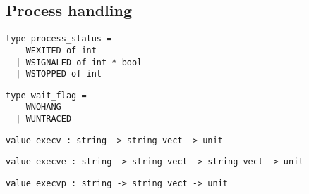 \subsection*{Process handling }\begin{verbatim}
type process_status =
    WEXITED of int
  | WSIGNALED of int * bool
  | WSTOPPED of int
\end{verbatim}
\begin{comment}
 The termination status of a process. \verbWEXITED means that the
           process terminated normally by \verbexit; the argument is the return
           code. \verbWSIGNALED means that the process was killed by a signal;
           the first argument is the signal number, the second argument
           indicates whether a ``core dump'' was performed. \verbWSTOPPED means
           that the process was stopped by a signal; the argument is the
           signal number. 
\end{comment}
\begin{verbatim}
type wait_flag =
    WNOHANG
  | WUNTRACED
\end{verbatim}
\begin{comment}
 Flags for \verbwaitopt and \verbwaitpid.
           \verbWNOHANG means do not block if no child has
           died yet, but immediately return with a pid equal to 0.
           \verbWUNTRACED means report also the children that receive stop
           signals. 
\end{comment}
\begin{verbatim}
value execv : string -> string vect -> unit
\end{verbatim}
%
\begin{comment}
 \verbexecv prog args execute the program in file \verbprog, with
           the arguments \verbargs, and the current process environment. 
\end{comment}
\begin{verbatim}
value execve : string -> string vect -> string vect -> unit
\end{verbatim}
%
\begin{comment}
 Same as \verbexecv, except that the third argument provides the
           environment to the program executed. 
\end{comment}
\begin{verbatim}
value execvp : string -> string vect -> unit
\end{verbatim}
%
\begin{comment}
 Same as \verbexecv, except that the program is searched in the path. 
\end{comment}
